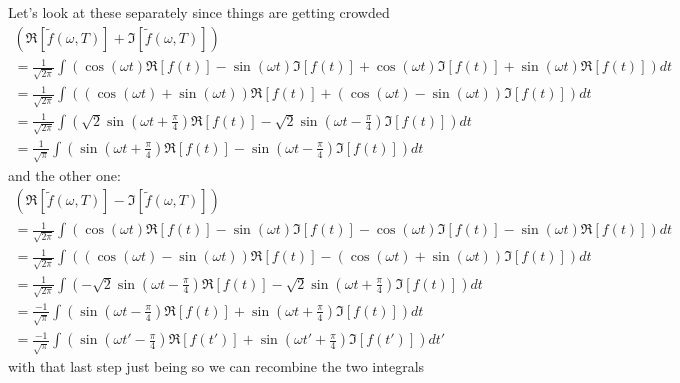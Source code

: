 Let's look at these separately since things are getting crowded
\begin{align}
   \left( \Re \left[ \tilde{f} (\omega, T)  \right] + \Im \left[ \tilde{f} (\omega, T)  \right] \right) \\
   =\frac{1}{\sqrt{2 \pi}} \int \left(  \cos (\omega t ) \Re\left[ f(t) \right]  -  \sin (\omega t) \Im \left[f(t)\right] +   \cos (\omega t ) \Im\left[ f(t) \right]  +  \sin (\omega t) \Re \left[f(t)\right] \right) d t \\
   =\frac{1}{\sqrt{2 \pi}} \int \left(  \left( \cos (\omega t ) +  \sin (\omega t) \right) \Re\left[ f(t) \right]  + \left( \cos (\omega t ) -  \sin (\omega t) \right) \Im \left[f(t)\right] \right) d t \\
   =\frac{1}{\sqrt{2 \pi}} \int \left( \sqrt{2} \sin \left(  \omega t + \frac{\pi }{4} \right) \Re\left[ f(t) \right]  - \sqrt{2} \sin \left(  \omega t - \frac{\pi }{4} \right) \Im \left[f(t)\right] \right) d t \\
   =\frac{1}{\sqrt{\pi}} \int \left( \sin \left(  \omega t + \frac{\pi }{4} \right) \Re\left[ f(t) \right]  - \sin \left(  \omega t - \frac{\pi }{4} \right) \Im \left[f(t)\right] \right) d t
\end{align}
and the other one:
\begin{align}
   \left( \Re \left[ \tilde{f} (\omega, T)  \right] - \Im \left[ \tilde{f} (\omega, T)  \right] \right) \\
   =\frac{1}{\sqrt{2 \pi}} \int \left(  \cos (\omega t ) \Re\left[ f(t) \right]  -  \sin (\omega t) \Im \left[f(t)\right] -   \cos (\omega t ) \Im\left[ f(t) \right]  -  \sin (\omega t) \Re \left[f(t)\right] \right) d t \\
   =\frac{1}{\sqrt{2 \pi}} \int \left(  \left( \cos (\omega t ) -  \sin (\omega t) \right) \Re\left[ f(t) \right]  - \left( \cos (\omega t ) +  \sin (\omega t) \right) \Im \left[f(t)\right] \right) d t \\
   =\frac{1}{\sqrt{2 \pi}} \int \left( -\sqrt{2} \sin \left(  \omega t - \frac{\pi }{4} \right) \Re\left[ f(t) \right]  - \sqrt{2} \sin \left(  \omega t + \frac{\pi }{4} \right) \Im \left[f(t)\right] \right) d t \\
   =\frac{-1}{\sqrt{\pi}} \int \left( \sin \left(  \omega t - \frac{\pi }{4} \right) \Re\left[ f(t) \right]  + \sin \left(  \omega t + \frac{\pi }{4} \right) \Im \left[f(t)\right] \right) d t \\
   =\frac{-1}{\sqrt{\pi}} \int \left( \sin \left(  \omega t' - \frac{\pi }{4} \right) \Re\left[ f(t') \right]  + \sin \left(  \omega t' + \frac{\pi }{4} \right) \Im \left[f(t')\right] \right) d t'
\end{align}
with that last step just being so we can recombine the two integrals

